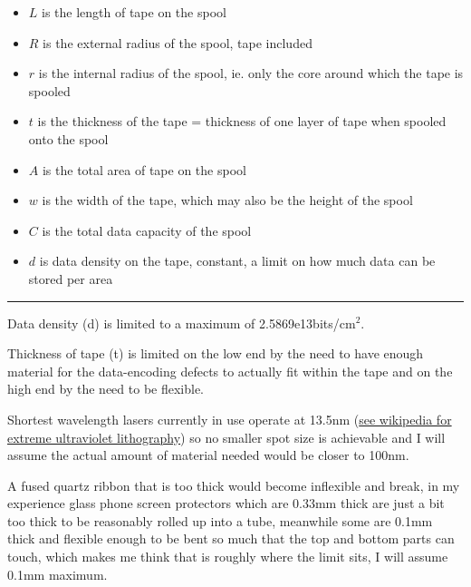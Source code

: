 \documentclass[a4paper]{article}
\begin{document}
	\begin{itemize}
		\item $L$ is the length of tape on the spool
		
		\item $R$ is the external radius of the spool, tape included
		
		\item $r$ is the internal radius of the spool, ie. only the core around which the tape is spooled
		
		\item $t$ is the thickness of the tape = thickness of one layer of tape when spooled onto the spool
		
		\item $A$ is the total area of tape on the spool
		
		\item $w$ is the width of the tape, which may also be the height of the spool
		
		\item $C$ is the total data capacity of the spool
		
		\item $d$ is data density on the tape, constant, a limit on how much data can be stored per area
	\end{itemize}
	
	\medskip
	
	\noindent \rule{\linewidth}{1pt}
	
	\medskip
	
	Data density (d) is limited to a maximum of 2.5869e13bits/cm$^2$.
	
	\bigskip
	
	Thickness of tape (t) is limited on the low end by the need to have enough material for the data-encoding defects to actually fit within the tape and on the high end by the need to be flexible.
	
	\medskip
	
	Shortest wavelength lasers currently in use operate at 13.5nm (\href{https://en.wikipedia.org/wiki/Extreme_ultraviolet_lithography}{see wikipedia for extreme ultraviolet lithography}) so no smaller spot size is achievable and I will assume the actual amount of material needed would be closer to 100nm.
	
	\medskip
	
	A fused quartz ribbon that is too thick would become inflexible and break, in my experience glass phone screen protectors which are 0.33mm thick are just a bit too thick to be reasonably rolled up into a tube, meanwhile some are 0.1mm thick and flexible enough to be bent so much that the top and bottom parts can touch, which makes me think that is roughly where the limit sits, I will assume 0.1mm maximum.
	
\end{document}

